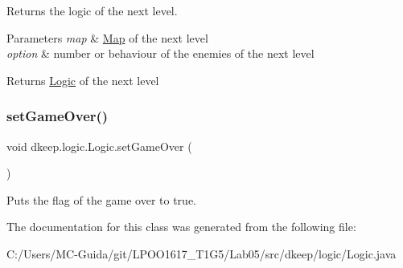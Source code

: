 Returns the logic of the next level. 
\begin{DoxyParams}{Parameters}
{\em map} & \hyperlink{classdkeep_1_1logic_1_1_map}{Map} of the next level \\
\hline
{\em option} & number or behaviour of the enemies of the next level \\
\hline
\end{DoxyParams}
\begin{DoxyReturn}{Returns}
\hyperlink{classdkeep_1_1logic_1_1_logic}{Logic} of the next level 
\end{DoxyReturn}
\mbox{\label{classdkeep_1_1logic_1_1_logic_a6f9b5655e854e6460900b165f3f5f17a}} 
\subsubsection{\texorpdfstring{set\+Game\+Over()}{setGameOver()}}
{\footnotesize\ttfamily void dkeep.\+logic.\+Logic.\+set\+Game\+Over (\begin{DoxyParamCaption}{ }\end{DoxyParamCaption})}

Puts the flag of the game over to true. 

The documentation for this class was generated from the following file\+:\begin{DoxyCompactItemize}
\item 
C\+:/\+Users/\+M\+C-\/\+Guida/git/\+L\+P\+O\+O1617\+\_\+\+T1\+G5/\+Lab05/src/dkeep/logic/Logic.\+java\end{DoxyCompactItemize}
